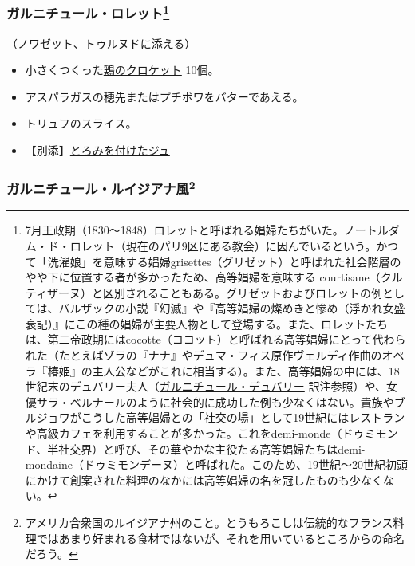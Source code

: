 \begin{recette}
{\subsubsection[ガルニチュール・ロレット]{\texorpdfstring{ガルニチュール・ロレット\footnote{7月王政期（1830〜1848）ロレットと呼ばれる娼婦たちがいた。ノートルダム・ド・ロレット（現在のパリ9区にある教会）に因んでいるという。かつて「洗濯娘」を意味する娼婦grisettes（グリゼット）と呼ばれた社会階層のやや下に位置する者が多かったため、高等娼婦を意味する
  courtisane（クルティザーヌ）と区別されることもある。グリゼットおよびロレットの例としては、バルザックの小説『幻滅』や『高等娼婦の燦めきと惨め（浮かれ女盛衰記）』にこの種の娼婦が主要人物として登場する。また、ロレットたちは、第二帝政期にはcocotte（ココット）と呼ばれる高等娼婦にとって代わられた（たとえばゾラの『ナナ』やデュマ・フィス原作ヴェルディ作曲のオペラ『椿姫』の主人公などがこれに相当する）。また、高等娼婦の中には、18世紀末のデュバリー夫人（\protect\hyperlink{garniture-dubarry}{ガルニチュール・デュバリー}
  訳注参照）や、女優サラ・ベルナールのように社会的に成功した例も少なくはない。貴族やブルジョワがこうした高等娼婦との「社交の場」として19世紀にはレストランや高級カフェを利用することが多かった。これをdemi-monde（ドゥミモンド、半社交界）と呼び、その華やかな主役たる高等娼婦たちはdemi-mondaine（ドゥミモンデーヌ）と呼ばれた。このため、19世紀〜20世紀初頭にかけて創案された料理のなかには高等娼婦の名を冠したものも少なくない。}}{ガルニチュール・ロレット}}\label{garniture-lorette}}



（ノワゼット、トゥルヌドに添える）

\begin{itemize}
\item
  小さくつくった\protect\hyperlink{croquettes-de-volaille}{鶏のクロケット}
  10個。
\item
  アスパラガスの穂先またはプチポワをバターであえる。
\item
  トリュフのスライス。
\item
  【別添】\protect\hyperlink{jus-de-veau-lie}{とろみを付けたジュ}
\end{itemize}

\atoaki{}

\hypertarget{garniture-louisiane}{%
\subsubsection[ガルニチュール・ルイジアナ風]{\texorpdfstring{ガルニチュール・ルイジアナ風\footnote{アメリカ合衆国のルイジアナ州のこと。とうもろこしは伝統的なフランス料理ではあまり好まれる食材ではないが、それを用いているところからの命名だろう。}}{ガルニチュール・ルイジアナ風}}\label{garniture-louisiane}}


\end{recette}
